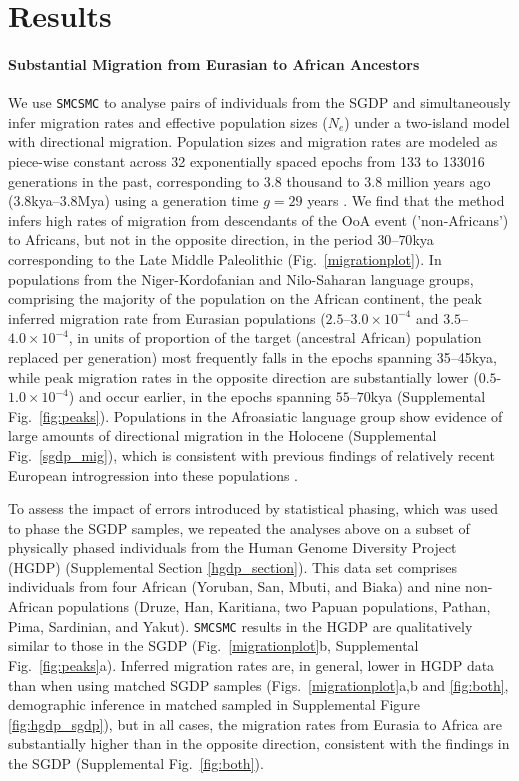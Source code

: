 \documentclass{article}
\begin{document}
\section{Results}

\paragraph{Substantial Migration from Eurasian to African Ancestors} We use {\tt SMCSMC} to analyse pairs of individuals from the SGDP and simultaneously infer migration rates and effective population sizes ($N_e$) under a two-island model with directional migration.  Population sizes and migration rates are modeled as piece-wise constant across 32 exponentially spaced epochs from 133 to 133016 generations in the past, corresponding to 3.8 thousand to 3.8 million years ago (3.8kya--3.8Mya) using a generation time $g=29$ years \cite{Fenner2005}.  We find that the method infers high rates of migration from descendants of the OoA event ('non-Africans') to Africans, but not in the opposite direction, in the period $30$--$70$kya corresponding to the Late Middle Paleolithic (Fig.\ \ref{migrationplot}). In populations from the Niger-Kordofanian and Nilo-Saharan language groups, comprising the majority of the population on the African continent, the peak inferred migration rate from Eurasian populations ($2.5$--$3.0\times 10^{-4}$ and $3.5$--$4.0\times 10^{-4}$, in units of proportion of the target (ancestral African) population replaced per generation) most frequently falls in the epochs spanning 35--45kya, while peak migration rates in the opposite direction are substantially lower ($0.5$-$1.0\times 10^{-4}$) and occur earlier, in the epochs spanning $55$--$70$kya (Supplemental Fig.\ \ref{fig:peaks}). Populations in the Afroasiatic language group show evidence of large amounts of directional migration in the Holocene (Supplemental Fig.\ \ref{sgdp_mig}), which is consistent with previous findings of relatively recent European introgression into these populations \cite{Busby2016, Fan2019}. 

To assess the impact of errors introduced by statistical phasing, which was used to phase the SGDP samples, we repeated the analyses above on a subset of physically phased individuals from the Human Genome Diversity Project (HGDP) \cite{Mallick2016} (Supplemental Section \ref{hgdp_section}). This data set comprises individuals from four African (Yoruban, San, Mbuti, and Biaka) and nine non-African populations (Druze, Han, Karitiana, two Papuan populations, Pathan, Pima, Sardinian, and Yakut). {\tt SMCSMC} results in the HGDP are qualitatively similar to those in the SGDP (Fig.\ \ref{migrationplot}b, Supplemental Fig.\ \ref{fig:peaks}a). Inferred migration rates are, in general, lower in HGDP data than when using matched SGDP samples (Figs.\ \ref{migrationplot}a,b and \ref{fig:both}, demographic inference in matched sampled in Supplemental Figure \ref{fig:hgdp_sgdp}), but in all cases, the migration rates from Eurasia to Africa are substantially higher than in the opposite direction, consistent with the findings in the SGDP (Supplemental Fig.\ \ref{fig:both}). 
\end{document}
